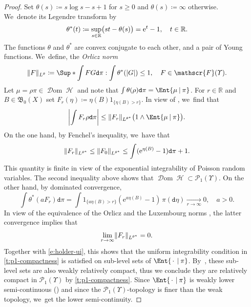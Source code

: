 \documentclass[JEP,XML,SOM,Unicode,published]{cedram}
\newcommand{\real}{\mathbb{R}}
\theoremstyle{definition}
\theoremstyle{remark}
\DeclarePairedDelimiter{\paren}{\lparen}{\rparen}
\DeclarePairedDelimiter{\abs}{\lvert}{\rvert}
\DeclarePairedDelimiter{\norm}{\lVert}{\rVert}
\newcommand{\given}[1][]{%
\nonscript\:#1\vert
\allowbreak
\nonscript\:
\mathopen{}}
\DeclareMathOperator{\ent}{\mathcal{H}}
\DeclareMathOperator{\dom}{\mathscr{D}om}
\newcommand{\emparg}{\,\cdot\,}
\begin{document}
\begin{proof}
Set $\theta(s) \coloneq s \log s - s + 1$ for $s \geq 0$ and $\theta(s) \coloneq \infty$ otherwise. We~denote its Legendre transform by
\begin{equation*}
\theta^{*}(t) \coloneq \sup_{s \in \real} \paren[\big]{s t - \theta(s) } = \mathrm{e}^{t} - 1, \quad t \in \real.
\end{equation*}
The functions $\theta$ and $\theta^{*}$ are convex conjugate to each other, and a pair of Young functions. We~define, the \emph{Orlicz norm}
\begin{equation*}
\norm{F}_{L^\theta} \coloneq \Sup*{ \int FG \mathtt{d} \pi : \int \theta^{*}(|G|) \leq 1 }, \quad F \in \mathscr{F}(\varUpsilon).
\end{equation*}
Let $\mu=\rho\pi \in \dom \ent$ and note that $\int \theta(\rho) \mathtt{d} \pi = \Ent{\mu \given \pi}$.
For $r \in \real$ and $B \in \mathfrak{B}_{0}(X)$ set $F_{r}(\eta) \coloneq \eta(B) 1_{\{ \eta(B) > r\}}$.
In view of \cite[Eq.\,(9.13), p.\,73]{Orlicz}, we~find that
\begin{equation}\label{e:holder-ui}
\abs*{ \int F_{r} \rho \mathtt{d} \pi } \leq \norm{F_{r}}_{L^{\theta^{*}}} \paren[\big]{1 \wedge \Ent{\mu \given \pi}}.
\end{equation}
On the one hand, by Fenchel's inequality, we~have that
\begin{equation}\label{eq:FenchelIotaB}
\norm{F_{r}}_{L^{\theta^{*}}}\leq \norm{F_{0}}_{L^{\theta^{*}}} \leq \int (\mathrm{e}^{\eta(B)} - 1) \mathtt{d} \pi + 1.
\end{equation}
This quantity is finite in view of the exponential integrability of Poisson random variables.
The second inequality above shows that $\dom \ent \subset \mathscr{P}_{1}(\varUpsilon)$.
On the other hand, by dominated convergence,
\begin{equation*}
\int \theta^{*}(a F_{r}) \mathtt{d} \pi = \int 1_{\{ a \eta(B) > r \}} (\mathrm{e}^{a \eta(B)} - 1)\, \pi(\mathtt{d} \eta) \xrightarrow[r\to\infty]{} 0, \quad a > 0.
\end{equation*}
In view of the equivalence of the Orlicz and the Luxembourg norms \cite[Eq.\,(9.24), p.\,80]{Orlicz}, the latter convergence implies that
\begin{equation*}
\lim_{r \to \infty} \norm{F_{r}}_{L^{\theta^{*}}} = 0.
\end{equation*}
Together with \cref{e:holder-ui}, this shows that the uniform integrability condition in \cref{t:p1-compactness} is satisfied on sub-level sets of $\Ent{\emparg \given \pi}$.
By~\cite[Lem.\,6.2.12]{DemboZeitouni}, these sub-level sets are also weakly relatively compact, thus we conclude they are relatively compact in $\mathscr{P}_{1}(\varUpsilon)$ by \cref{t:p1-compactness}.
Since $\Ent{ \emparg \given \pi}$ is weakly lower semi-continuous (\eg \cite[Lem.\,6.2.13]{DemboZeitouni}) and since the $\mathscr{P}_{1}(\varUpsilon)$-topology is finer than the weak topology, we~get the lower semi-continuity.
\end{proof}
\end{document}
